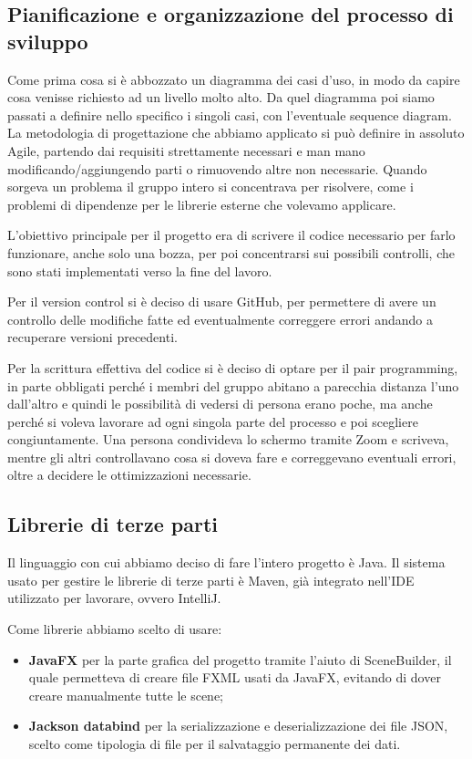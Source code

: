 \documentclass{article}
\begin{document}
    \subsection{Pianificazione e organizzazione del processo di sviluppo}

    Come prima cosa si è abbozzato un diagramma dei casi d'uso, in modo da capire cosa venisse richiesto ad un livello molto alto. Da quel diagramma poi siamo passati a definire nello specifico i singoli casi, con l'eventuale sequence diagram. La metodologia di progettazione che abbiamo applicato si può definire in assoluto Agile, partendo dai requisiti strettamente necessari e man mano modificando/aggiungendo parti o rimuovendo altre non necessarie. Quando sorgeva un problema il gruppo intero si concentrava per risolvere, come i problemi di dipendenze per le librerie esterne che volevamo applicare.
    
    L'obiettivo principale per il progetto era di scrivere il codice necessario per farlo funzionare, anche solo una bozza, per poi concentrarsi sui possibili controlli, che sono stati implementati verso la fine del lavoro.


    Per il version control si è deciso di usare GitHub, per permettere di avere un controllo delle modifiche fatte ed eventualmente correggere errori andando a recuperare versioni precedenti.

    Per la scrittura effettiva del codice si è deciso di optare per il pair programming, in parte obbligati perché i membri del gruppo abitano a parecchia distanza l'uno dall'altro e quindi le possibilità di vedersi di persona erano poche, ma anche perché si voleva lavorare ad ogni singola parte del processo e poi scegliere congiuntamente. Una persona condivideva lo schermo tramite Zoom e scriveva, mentre gli altri controllavano cosa si doveva fare e correggevano eventuali errori, oltre a decidere le ottimizzazioni necessarie.

    \subsection{Librerie di terze parti}

    Il linguaggio con cui abbiamo deciso di fare l'intero progetto è Java. Il sistema usato per gestire le librerie di terze parti è Maven, già integrato nell'IDE utilizzato per lavorare, ovvero IntelliJ. 
    
    Come librerie abbiamo scelto di usare:
    \begin{itemize}
        \item[] \textbf{JavaFX} per la parte grafica del progetto tramite l'aiuto di SceneBuilder, il quale permetteva di creare file FXML usati da JavaFX, evitando di dover creare manualmente tutte le scene;
        \item[] \textbf{Jackson databind} per la serializzazione e deserializzazione dei file JSON, scelto come tipologia di file per il salvataggio permanente dei dati.
    \end{itemize}
\end{document}
